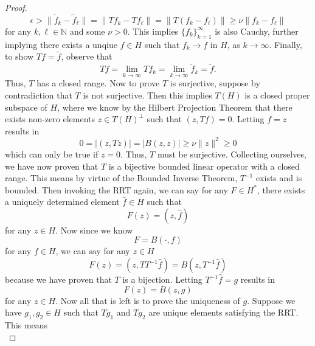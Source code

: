 \documentclass[11pt]{article}
\theoremstyle{definition}
\begin{document}
\begin{proof}
	\begin{equation*}
		\epsilon > \|\tilde{f}_k - \tilde{f}_{\ell}\| = \|Tf_k - Tf_{\ell}\| = \|T(f_k - f_{\ell})\| \geq \nu \|f_k - f_{\ell}\|
	\end{equation*}
	for any $k,\ell \in \mathbb{N}$ and some $\nu >0$.
	This implies $\{f_k\}_{k=1}^{\infty}$ is also Cauchy, further implying there exists a unqiue $f \in H$ such that
	$f_k \rightarrow f$ in $H$, as $k \rightarrow \infty$.
	Finally, to show $Tf = \tilde{f}$, observe that
	\begin{equation*}
		Tf = \lim_{k\rightarrow \infty}{Tf_k} = \lim_{k\rightarrow \infty}{\tilde{f}_k} = \tilde{f}.
	\end{equation*}
	Thus, $T$ has a closed range. Now to prove $T$ is surjective, suppose by contradiction that $T$ is not surjective.
	Then this implies $T(H)$ is a closed proper subspace of $H$, where we know by the Hilbert Projection Theorem that
	there exists non-zero elements $z \in T(H)^{\bot}$ such that $(z,Tf) = 0$. Letting $f = z$ results in
	\begin{equation*}
		0 = |(z,Tz)| = |B(z,z)| \geq \nu \|z\|^2 \geq 0
	\end{equation*}
	which can only be true if $z = 0$. Thus, $T$ must be surjective.
	Collecting ourselves, we have now proven that $T$ is a bijective bounded linear operator with a closed range.
	This means by virtue of the Bounded Inverse Theorem, $T^{-1}$ exists and is bounded.
	Then invoking the RRT again, we can say for any $F \in H^*$, there exists a uniquely determined element $\hat{f} \in H$ such that
	\begin{equation*}
		F(z) = (z,\hat{f})
	\end{equation*}
	for any $z \in H$. Now since we know
	\begin{equation*}
		F = B(\cdot,f)
	\end{equation*}
	for any $f \in H$, we can say for any $z \in H$
	\begin{equation*}
		F(z) = (z, TT^{-1}\hat{f}) = B(z,T^{-1}\hat{f})
	\end{equation*}
	because we have proven that $T$ is a bijection. Letting $T^{-1}\hat{f} = g$ results in
	\begin{equation*}
		F(z) = B(z,g)
	\end{equation*}
	for any $z \in H$. Now all that is left is to prove the uniqueness of $g$.
	Suppose we have $g_1,g_2 \in H$ such that $Tg_1$ and $Tg_2$ are unique elements satisfying
	the RRT. This means
	\begin{equation*}

\end{equation*}
\end{proof}
\end{document}
